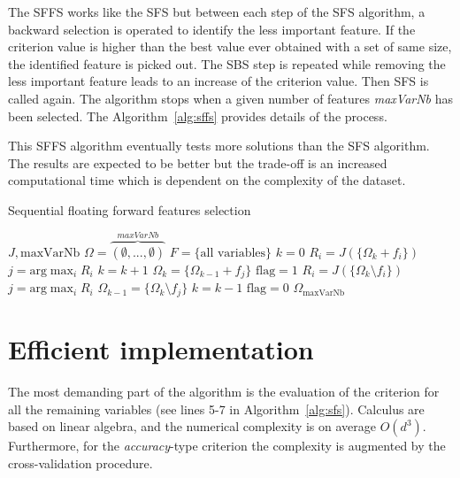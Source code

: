 \documentclass[journal]{IEEEtran}
\begin{document}
        The SFFS works like the SFS but between each step of the SFS algorithm, a backward selection is operated to identify the less important feature. If the criterion value is higher than the best value ever obtained with a set of same size, the identified feature is picked out. The SBS step is repeated while removing the less important feature leads to an increase of the criterion value. Then SFS is called again. The algorithm stops when a given number of features \emph{maxVarNb} has been selected. The Algorithm~\ref{alg:sffs} provides details of the process.

        This SFFS algorithm eventually tests more solutions than the SFS algorithm. The results are expected to be better but the trade-off is an increased computational time which is dependent on the complexity of the dataset.

        \begin{algorithm}
        \caption{Sequential floating forward features selection\label{alg:sffs}}
        {\footnotesize
        \begin{algorithmic}[1]
        \REQUIRE $J,\text{maxVarNb}$
        \STATE $\Omega=\overbrace{(\emptyset,...,\emptyset)}^{maxVarNb}$
        \STATE $F=\text{\{all variables\}}$
        \STATE $k=0$
        \STATE $R_i = J(\{\Omega_k + f_i\})$
        \ENDFOR
        \STATE $j=\text{arg} \max_{i} R_i$
        \STATE $k=k+1$
        \STATE $\Omega_k = \{\Omega_{k-1} + f_j\}$
        \STATE $\text{flag}=1$
        \STATE $R_i = J(\{\Omega_k \setminus f_i\})$
        \ENDFOR
        \STATE $j=\text{arg} \max_{i} R_i$
        \STATE $\Omega_{k-1} = \{\Omega_k \setminus f_j\}$
        \STATE $k=k-1$
        \ELSE
        \STATE $\text{flag}=0$
        \ENDIF
        \ENDWHILE
        \ENDIF
        \ENDWHILE
        \RETURN $\Omega_{\text{maxVarNb}}$
        \end{algorithmic}
        }
        \end{algorithm}


\section{Efficient implementation}
\label{sec:implementation}
The most  demanding part  of the  algorithm is  the evaluation  of the
criterion  for  all   the  remaining  variables  (see   lines  5-7  in
Algorithm~\ref{alg:sfs}). Calculus are based on linear algebra, and the
numerical  complexity is  on average  $O(d^3)$.  Furthermore,  for the
\emph{accuracy}-type  criterion the  complexity  is  augmented by  the
cross-validation procedure.
\end{document}
